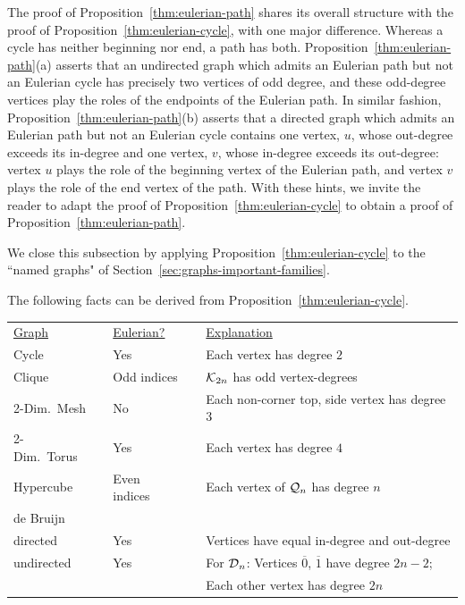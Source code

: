 The proof of Proposition~\ref{thm:eulerian-path} shares its overall structure with the proof of  Proposition~\ref{thm:eulerian-cycle}, with one major difference.  Whereas a cycle has neither beginning nor end, a path has both.  Proposition~\ref{thm:eulerian-path}(a) asserts that an undirected graph which admits an Eulerian path but not an Eulerian cycle has precisely two vertices of odd degree, and these odd-degree vertices play the roles of the endpoints of the Eulerian path.  In similar fashion, Proposition~\ref{thm:eulerian-path}(b) asserts that a directed graph which admits an Eulerian path but not an Eulerian cycle contains one vertex, $u$, whose out-degree exceeds its in-degree and one vertex, $v$, whose in-degree exceeds its out-degree: vertex $u$ plays the role of the beginning vertex of the Eulerian path, and vertex $v$ plays the role of the end vertex of the path.  With these hints, we invite the reader to adapt the proof of Proposition~\ref{thm:eulerian-cycle} to obtain a proof of Proposition~\ref{thm:eulerian-path}.

\bigskip

We close this subsection by applying Proposition~\ref{thm:eulerian-cycle} to the ``named graphs" of Section~\ref{sec:graphs-important-families}.

\medskip

\begin{corol}
\label{corol:eulerian-named-graphs}
The following facts can be derived from Proposition~\ref{thm:eulerian-cycle}.

\medskip

\noindent
\begin{tabular}{lclcl}
\underline{Graph} & & \underline{Eulerian?} & & \underline{Explanation} \\ 
Cycle               & & Yes                     & & Each vertex has degree $2$ \\
Clique              & & Odd indices   & & $\mbox{$\cal K$}_{2n}$ has odd vertex-degrees \\
2-Dim.~Mesh   & & No                      & & Each non-corner top, side vertex has degree $3$ \\                      
2-Dim.~Torus   & & Yes                     & & Each vertex has degree $4$ \\
Hypercube       & & Even indices & & Each vertex of $\mbox{$\cal Q$}_n$ has degree $n$ \\
de Bruijn           & &                           & &  \\
\hspace*{.15in}directed  & & Yes  & & Vertices have equal {\sc in-degree} and {\sc out-degree} \\
\hspace*{.15in}undirected
         & &  Yes & & For $\mbox{$\cal D$}_n$: Vertices $\overline{0}$, $\overline{1}$ have
                                                  degree $2n-2$; \\
         & &         & & \hspace*{.5in}Each other vertex has degree $2n$
\end{tabular}
\end{corol}

